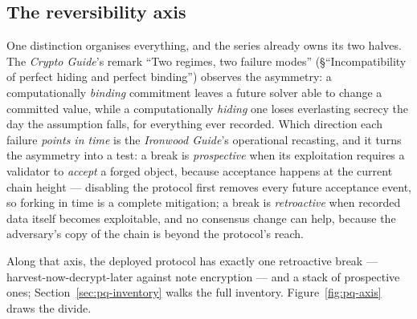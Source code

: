 \documentclass[11pt,a4paper]{article}
\theoremstyle{definition}
\begin{document}
\subsection{The reversibility axis}\label{sec:pq-axis}

One distinction organises everything, and the series already owns its
two halves. The \emph{Crypto Guide}'s remark ``Two regimes, two failure
modes'' (\S``Incompatibility of perfect hiding and perfect binding'')
observes the asymmetry: a computationally \emph{binding} commitment
leaves a future solver able to change a committed value, while a
computationally \emph{hiding} one loses everlasting secrecy the day the
assumption falls, for everything ever recorded. Which direction each
failure \emph{points in time} is the \emph{Ironwood Guide}'s
operational recasting, and it turns the asymmetry into a test: a break
is \emph{prospective} when its
exploitation requires a validator to \emph{accept} a forged object,
because acceptance happens at the current chain height --- disabling
the protocol first removes every future acceptance event, so forking in
time is a complete mitigation; a break is \emph{retroactive} when
recorded data itself becomes exploitable, and no consensus change can
help, because the adversary's copy of the chain is beyond the
protocol's reach.

Along that axis, the deployed protocol has exactly one retroactive
break --- harvest-now-decrypt-later against note encryption --- and a
stack of prospective ones; Section~\ref{sec:pq-inventory} walks the full
inventory. Figure~\ref{fig:pq-axis} draws the divide.
\end{document}

